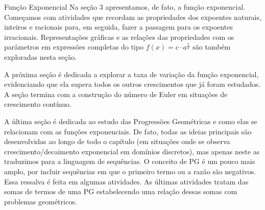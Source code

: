 \begin{apresentacao}{Função Exponencial}
Na seção 3 apresentamos, de fato, a função exponencial. Começamos com atividades que recordam as propriedades dos expoentes naturais, inteiros e racionais para, em seguida, fazer a passagem para os expoentes irracionais. Representações gráficas e as relações das propriedades com os parâmetros em expressões completas do tipo $f(x)=c\cdot a^{\frac xd}$ são também exploradas nesta seção.

A próxima seção é dedicada a explorar a taxa de variação da função exponencial, evidenciando que ela supera todos os outros crescimentos que já foram estudados. A seção termina com a construção do número de Euler em situações de crescimento contínuo.

A última seção é dedicada ao estudo das Progressões Geométricas e como elas se relacionam com as funções exponenciais. De fato, todas as ideias principais são desenvolvidas ao longo de todo o capítulo (em situações onde se observa crescimento/decaimento exponencial em domínios discretos), mas apenas neste as traduzimos para a linguagem de sequências. O conceito de PG é um pouco mais amplo, por incluir sequências em que o primeiro termo ou a razão são negativos. Essa ressalva é feita em algumas atividades. As últimas atividades tratam das somas de termos de uma PG estabelecendo uma relação dessas somas com problemas geométricos.
\end{apresentacao}

